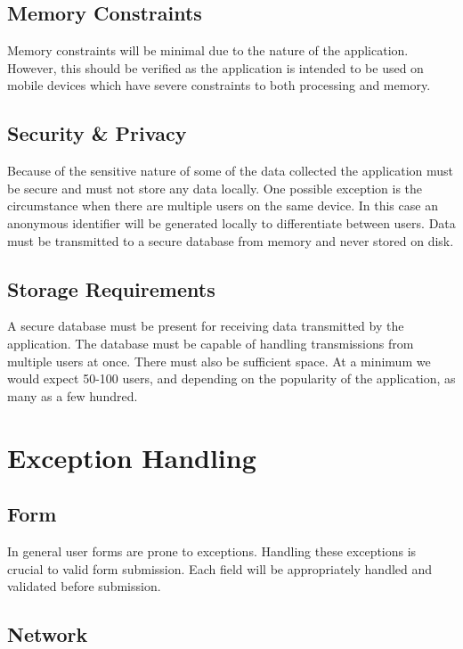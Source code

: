 \documentclass[a4wide]{article}
\begin{document}
\subsection{Memory Constraints}
Memory constraints will be minimal due to the nature of the application.
However, this should be verified as the application is intended to be used on
mobile devices which have severe constraints to both processing and memory.

\subsection{Security \& Privacy}
Because of the sensitive nature of some of the data collected the application
must be secure and must not store any data locally.  One possible exception is
the circumstance when there are multiple users on the same device.  In this case
an anonymous identifier will be generated locally to differentiate between
users.  Data must be transmitted to a secure database from memory and never
stored on disk.

\subsection{Storage Requirements}
A secure database must be present for receiving data transmitted by the
application.  The database must be capable of handling transmissions from
multiple users at once.  There must also be sufficient space.  At a minimum we
would expect 50-100 users, and depending on the popularity of the application,
as many as a few hundred.



\section{Exception Handling}

\subsection{Form}

In general user forms are prone to exceptions.
Handling these exceptions is crucial to valid form submission.
Each field will be appropriately handled and validated before submission.

\subsection{Network}
\end{document}
